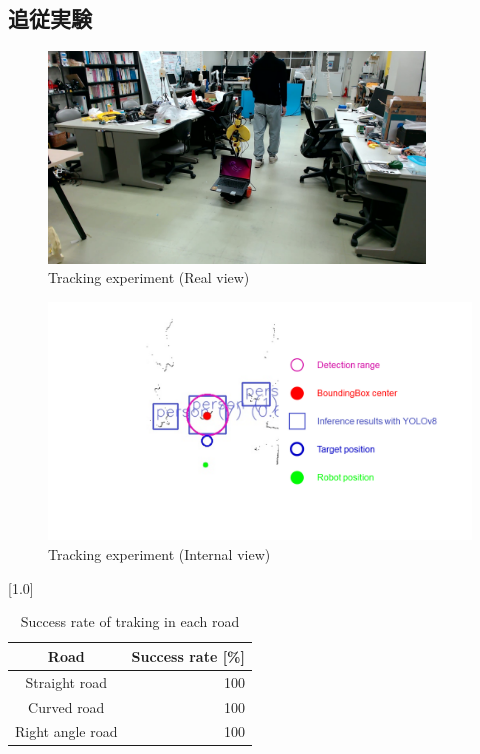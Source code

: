 \subsection{追従実験}
\begin{figure}[h]
  \begin{center}
  \includegraphics[width=100mm,clip]{figure/Tracking-experiment-Real-view.jpg}
  \caption{Tracking experiment (Real view)}
  \label{Tracking experiment (Real view)}
  \end{center}
\end{figure}

\begin{figure}[h]
  \begin{center}
  \includegraphics[width=170mm,clip]{figure/Tracking-experiment-Internal-view.png}
  \caption{Tracking experiment (Internal view)}
  \label{Tracking experiment (Internal view)}
  \end{center}
\end{figure}

\begin{table}[h]
    \begin{center}
      \caption{{Success rate of traking in each road}\label{Success rate of traking in each road}}
      \scalebox{1.2}[1.0]{
        \begin{tabular}{c|r} \hline
          Road & Success rate [\%] \\ \hline
          Straight road & 100 \\
          Curved road & 100 \\
          Right angle road & 100 \\ \hline
        \end{tabular}
      }
    \end{center}
\end{table}

